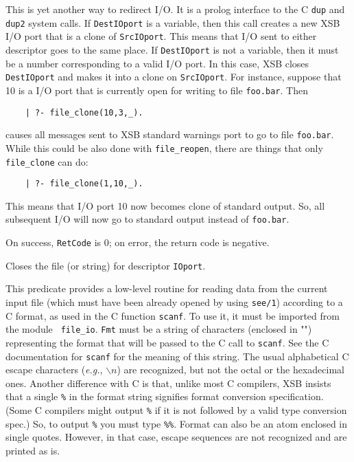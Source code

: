 \begin{description}
    This is yet another way to redirect I/O. It is a prolog interface to
    the C {\tt dup} and {\tt dup2} system calls. If {\tt DestIOport} is a
    variable, then this call creates a new XSB I/O port that is a
    clone of {\tt SrcIOport}. This means that I/O sent to either
    descriptor goes to the same place. If {\tt DestIOport} is not a
    variable, then it must be a number corresponding to a valid I/O
    port. In this case, XSB closes {\tt DestIOport} and makes it 
    into a clone on {\tt SrcIOport}. For instance, suppose that 10 is a
    I/O port that is currently open for writing to file {\tt foo.bar}.
    Then
    \begin{verbatim}
    | ?- file_clone(10,3,_).      
    \end{verbatim}
    causes all messages sent to XSB standard warnings port to go to file
    {\tt foo.bar}. While this could be also done with {\tt file\_reopen},
    there are things that only {\tt file\_clone} can do:
    \begin{verbatim}
    | ?- file_clone(1,10,_).      
    \end{verbatim}
    This means that I/O port 10 now becomes clone of standard
    output. So, all subsequent I/O will now go to standard output instead
    of {\tt foo.bar}. 

    On success, {\tt RetCode} is 0; on error, the return code is negative.

    Closes the file (or string) for descriptor {\tt IOport}.

    This predicate provides a low-level routine for reading data from
    the current input file (which must have been already opened by using
    {\tt see/1}) according to a C format, as used in the C function
    {\tt scanf}. To use it, it must be imported from the module {\tt
    file\_io}.  {\tt Fmt} must be a string of characters (enclosed in "")
    representing the format that 
    will be passed to the C call to {\tt scanf}.  See the C
    documentation for {\tt scanf} for the meaning of this string.
    The usual alphabetical C escape characters ({\it e.g.}, $\backslash n$)
    are recognized, but not the octal or the hexadecimal ones.
    Another difference with C is that, unlike most C compilers, XSB insists
    that a single {\tt \%} in the format string signifies format conversion
    specification. (Some C compilers might output {\tt \%} if it is not
    followed by a valid type conversion spec.) So, to output {\tt \%}
    you must type {\tt \%\%}.
    Format can also be an atom enclosed in single quotes. However, in that
    case, escape sequences are not recognized and are printed as is.


\end{description}
